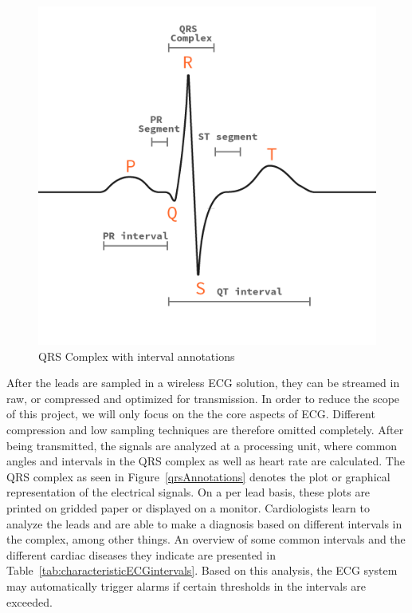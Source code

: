 \begin{figure}[H]
\centering
\includegraphics[scale=0.35]{img/figures/QRS.png}
\caption{QRS Complex with interval annotations}
\label{fig:qrsAnnotations}
\end{figure}

\noindent
After the leads are sampled in a wireless ECG solution, they can be streamed in raw, or compressed and optimized for transmission\cite{Balouchestani:2013dr, Alesanco:2010kc}. In order to reduce the scope of this project, we will only focus on the the core aspects of ECG. Different compression and low sampling techniques are therefore omitted completely. After being transmitted, the signals are analyzed at a processing unit, where common angles and intervals in the QRS complex as well as heart rate are calculated. The QRS complex as seen in Figure~\ref{qrsAnnotations} denotes the plot or graphical representation of the electrical signals. On a per lead basis, these plots are printed on gridded paper or displayed on a monitor. Cardiologists learn to analyze the leads and are able to make a diagnosis based on different intervals in the complex, among other things. An overview of some common intervals and the different cardiac diseases they indicate are presented in Table~\ref{tab:characteristicECGintervals}. Based on this analysis, the ECG system may automatically trigger alarms if certain thresholds in the intervals are exceeded.

